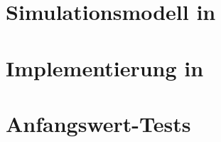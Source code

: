\section{Simulationsmodell in \Simulink}



\section{Implementierung in \Matlab}



\section{Anfangswert-Tests}\label{sec:x0test}

\newcommand{\scalee}{0.48}

